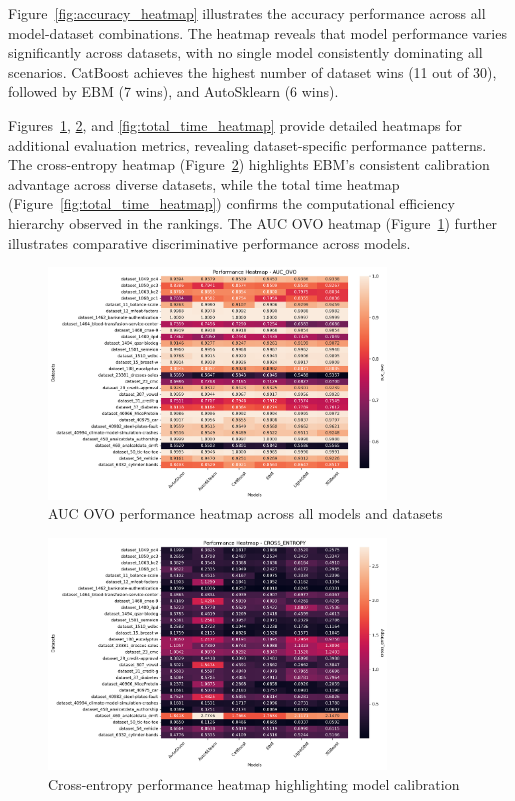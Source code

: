 \documentclass[12pt]{article}
\begin{document}
Figure~\ref{fig:accuracy_heatmap} illustrates the accuracy performance across all model-dataset combinations. The heatmap reveals that model performance varies significantly across datasets, with no single model consistently dominating all scenarios. CatBoost achieves the highest number of dataset wins (11 out of 30), followed by EBM (7 wins), and AutoSklearn (6 wins).

Figures~\ref{fig:auc_ovo_heatmap}, \ref{fig:cross_entropy_heatmap}, and \ref{fig:total_time_heatmap} provide detailed heatmaps for additional evaluation metrics, revealing dataset-specific performance patterns. The cross-entropy heatmap (Figure~\ref{fig:cross_entropy_heatmap}) highlights EBM’s consistent calibration advantage across diverse datasets, while the total time heatmap (Figure~\ref{fig:total_time_heatmap}) confirms the computational efficiency hierarchy observed in the rankings. The AUC OVO heatmap (Figure~\ref{fig:auc_ovo_heatmap}) further illustrates comparative discriminative performance across models.

\begin{figure}[ht]
\centering
\includegraphics[width=0.8\textwidth]{stat_results/heatmap_auc_ovo.png}
\caption{AUC OVO performance heatmap across all models and datasets}
\label{fig:auc_ovo_heatmap}
\end{figure}

\begin{figure}[ht]
\centering
\includegraphics[width=0.8\textwidth]{stat_results/heatmap_cross_entropy.png}
\caption{Cross-entropy performance heatmap highlighting model calibration}
\label{fig:cross_entropy_heatmap}
\end{figure}
\end{document}
